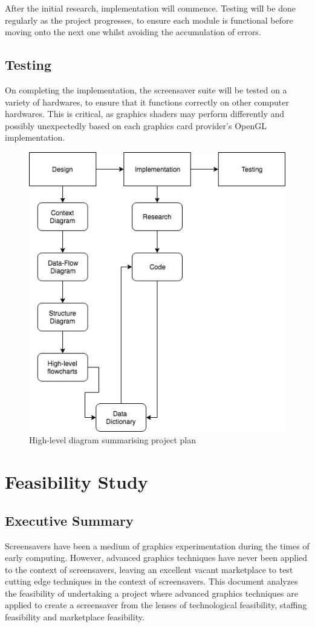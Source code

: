 \documentclass[10pt, openany]{book}
\begin{document}
After the initial research, implementation will commence. Testing will be done regularly as the project progresses, to ensure each module is functional before moving onto the next one whilst avoiding the accumulation of errors. 

\section{Testing}
On completing the implementation, the screensaver suite will be tested on a variety of hardwares, to ensure that it functions correctly on other computer hardwares. This is critical, as graphics \gls{shader}s may perform differently and possibly unexpectedly based on each graphics card provider's \gls{OpenGL} implementation.

\begin{figure}[H]
	\centering
	\includegraphics[width=0.6\linewidth]{project-plan}
	\caption{High-level diagram summarising project plan}
\end{figure}	

\chapter{Feasibility Study}

\section{Executive Summary}

Screensavers have been a medium of graphics experimentation during the times of early computing. However, advanced graphics techniques have never been applied to the context of screensavers, leaving an excellent vacant marketplace to test cutting edge techniques in the context of screensavers. This document analyzes the feasibility of undertaking a project where advanced graphics techniques are applied to create a screensaver from the lenses of technological feasibility, staffing feasibility and marketplace feasibility.
\end{document}
